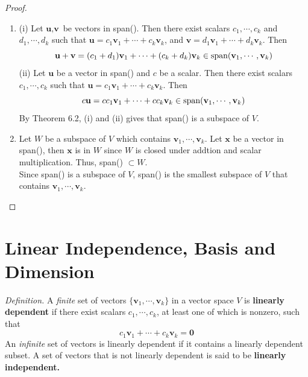 \begin{proof}
	\begin{enumerate}
		\item (i) Let $\textbf{u}, \textbf{v}$ be vectors in span(\vk). Then there exist scalars $c_1, \cdots, c_k$ and $d_1, \cdots, d_k$ such that $\textbf{u} = c_1\textbf{v}_1 + \cdots + c_k\textbf{v}_k$, and $\textbf{v} = d_1\textbf{v}_1 + \cdots + d_k\textbf{v}_k$. Then \begin{equation*}
			\textbf{u} + \textbf{v} = (c_1 + d_1)\textbf{v}_1 + \cdots + (c_k + d_k)\textbf{v}_k \in \textnormal{span}(\textbf{v}_1, \cdots, \textbf{v}_k)
		\end{equation*}
		(ii) Let $\textbf{u}$ be a vector in span(\vk) and $c$ be a scalar. Then there exist scalars $c_1, \cdots, c_k$ such that $\textbf{u} = c_1\textbf{v}_1 + \cdots + c_k\textbf{v}_k$. Then \begin{equation*}
			c\textbf{u} = cc_1\textbf{v}_1 + \cdots + cc_k\textbf{v}_k \in \textnormal{span}(\textbf{v}_1, \cdots, \textbf{v}_k)
		\end{equation*}
		By Theorem 6.2, (i) and (ii) gives that span(\vk) is a subspace of $V$.
		\item Let $W$ be a subspace of $V$ which contains $\textbf{v}_1, \cdots, \textbf{v}_k$. Let $\textbf{x}$ be a vector in span(\vk), then $\textbf{x}$ is in $W$ since $W$ is closed under addtion and scalar multiplication. Thus, span(\vk) $\subset W$. \\
		
		Since span(\vk) is a subspace of $V$, span(\vk) is the smallest subspace of $V$ that contains $\textbf{v}_1, \cdots, \textbf{v}_k$.
	\end{enumerate}
\end{proof}

\section{Linear Independence, Basis and Dimension}

\textit{Definition.} A \textit{finite} set of vectors $\{\textbf{v}_1, \cdots, \textbf{v}_k \}$ in a vector space $V$ is \textbf{linearly dependent} if there exist scalars $c_1, \cdots, c_k$, at least one of which is nonzero, such that \begin{equation*}
	c_1\textbf{v}_1 + \cdots + c_k\textbf{v}_k = \textbf{0}
\end{equation*} An \textit{infinite} set of vectors is linearly dependent if it contains a linearly dependent subset. A set of vectors that is not linearly dependent is said to be \textbf{linearly independent.} \\

